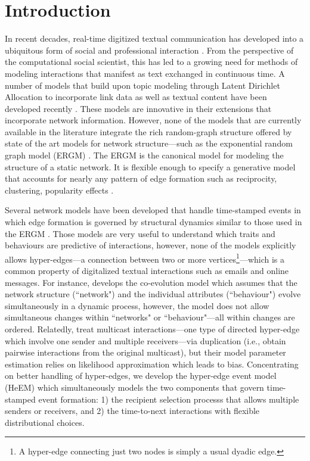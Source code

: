 \documentclass[12pt]{article}
\begin{document}
\section{Introduction}\label{sec:intro}
In recent decades, real-time digitized textual communication has developed into a ubiquitous form of social and professional interaction \citep{kanungo2008modeling, szostek2011dealing, burgess2004email, pew2016}. From the perspective of the computational social scientist, this has led to a growing need for methods of modeling interactions that manifest as text exchanged in continuous time. A number of models that build upon topic modeling through Latent Dirichlet Allocation \citep{Blei2003} to incorporate link data as well as textual content have been developed recently \citep{mccallum2005author,lim2013twitter,Krafft2012}. These models are innovative in their extensions that incorporate network information. However, none of the models that are currently available in the literature integrate the rich random-graph structure offered by state of the art models for network structure---such as the exponential random graph model (ERGM) \citep{robins2007introduction,chatterjee2013estimating,hunter2008ergm}. The ERGM is the canonical model for modeling the structure of a static network. It is flexible enough to specify a generative model that accounts for nearly any pattern of edge formation such as reciprocity, clustering, popularity effects \citep{desmarais2017statistical}. 

Several network models have been developed that handle time-stamped events in which edge formation is governed by structural dynamics similar to those used in the ERGM \citep{Butts2008,Vu2011,snijders1996stochastic}. Those models are very useful to understand which traits and behaviours are predictive of interactions, however, none of the models explicitly allows hyper-edges---a connection between two or more vertices\footnote{A hyper-edge connecting just two nodes is simply a usual dyadic edge.}---which is a common property of digitalized textual interactions such as emails and online messages. For instance, \cite{snijders2007modeling} develops the co-evolution model which assumes that the network structure (``network") and the individual attributes (``behaviour") evolve simultaneously in a dynamic process, however, the model does not allow simultaneous changes within ``networks" or ``behaviour"---all within changes are ordered.
Relatedly, \cite{PerryWolfe2012} treat multicast interactions---one type of directed hyper-edge which involve one sender and multiple receivers---via duplication (i.e., obtain pairwise interactions from the original multicast), but their model parameter estimation relies on likelihood approximation which leads to bias. Concentrating on better handling of hyper-edges, we develop the hyper-edge event model (HeEM) which simultaneously models the two components that govern time-stamped event formation: 1) the recipient selection processs that allows multiple senders or receivers, and 2) the time-to-next interactions with flexible distributional choices.
\end{document}
